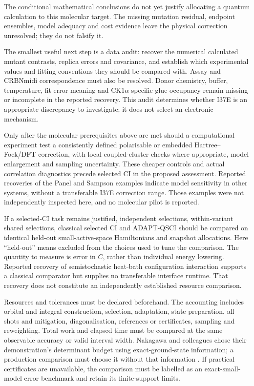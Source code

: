 \documentclass{article}
\begin{document}
The conditional mathematical conclusions do not yet justify allocating a quantum calculation to this molecular target. The missing mutation residual, endpoint ensembles, model adequacy and cost evidence leave the physical correction unresolved; they do not falsify it.

The smallest useful next step is a data audit: recover the numerical calculated mutant contrasts, replica errors and covariance, and establish which experimental values and fitting conventions they should be compared with. Assay and CRBNmidi correspondence must also be resolved. Donor chemistry, buffer, temperature, fit-error meaning and CK1\(\alpha\)-specific glue occupancy remain missing or incomplete in the reported recovery. This audit determines whether I37E is an appropriate discrepancy to investigate; it does not select an electronic mechanism.

Only after the molecular prerequisites above are met should a computational experiment test a consistently defined polarisable or embedded Hartree--Fock/DFT correction, with local coupled-cluster checks where appropriate, model enlargement and sampling uncertainty. These cheaper controls and actual correlation diagnostics precede selected CI in the proposed assessment. Reported recoveries of the Panel and Sampson examples indicate model sensitivity in other systems, without a transferable I37E correction range. Those examples were not independently inspected here, and no molecular pilot is reported.

If a selected-CI task remains justified, independent selections, within-variant shared selections, classical selected CI and ADAPT-QSCI should be compared on identical held-out small-active-space Hamiltonians and snapshot allocations. Here ``held-out'' means excluded from the choices used to tune the comparison. The quantity to measure is error in \(C\), rather than individual energy lowering. Reported recovery of semistochastic heat-bath configuration interaction supports a classical comparator but supplies no transferable interface runtime. That recovery does not constitute an independently established resource comparison.

Resources and tolerances must be declared beforehand. The accounting includes orbital and integral construction, selection, adaptation, state preparation, all shots and mitigation, diagonalisation, references or certificates, sampling and reweighting. Total work and elapsed time must be compared at the same observable accuracy or valid interval width. Nakagawa and colleagues chose their demonstration's determinant budget using exact-ground-state information; a production comparison must choose it without that information \cite{P}. If practical certificates are unavailable, the comparison must be labelled as an exact-small-model error benchmark and retain its finite-support limits.
\end{document}
